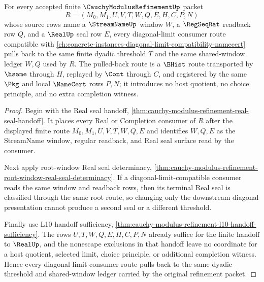 \begin{theorem}
\label{thm:cauchy-modulus-refinement-diagonal-route-pullback}
For every accepted finite $\CauchyModulusRefinementUp$ packet
$$
R=(M_0,M_1,U,V,T,W,Q,E,H,C,P,N)
$$
whose source rows name a $\StreamNameUp$ window $W$, a $\RegSeqRat$ readback row $Q$, and a $\RealUp$ seal row $E$, every diagonal-limit consumer route compatible with \autoref{ch:concrete-instances-diagonal-limit-compatibility-namecert} pulls back to the same finite dyadic threshold $T$ and the same shared-window ledger $W,Q$ used by $R$. The pulled-back route is a $\BHist$ route transported by $\hsame$ through $H$, replayed by $\Cont$ through $C$, and registered by the same $\Pkg$ and local $\NameCert$ rows $P,N$; it introduces no host quotient, no choice principle, and no extra completion witness.
\end{theorem}
\begin{proof}
Begin with the Real seal handoff, \autoref{thm:cauchy-modulus-refinement-real-seal-handoff}. It places every Real or Completion consumer of $R$ after the displayed finite route $M_0,M_1,U,V,T,W,Q,E$ and identifies $W,Q,E$ as the StreamName window, regular readback, and Real seal surface read by the consumer.

Next apply root-window Real seal determinacy, \autoref{thm:cauchy-modulus-refinement-root-window-real-seal-determinacy}. If a diagonal-limit-compatible consumer reads the same window and readback rows, then its terminal Real seal is classified through the same root route, so changing only the downstream diagonal presentation cannot produce a second seal or a different threshold.

Finally use L10 handoff sufficiency, \autoref{thm:cauchy-modulus-refinement-l10-handoff-sufficiency}. The rows $U,T,W,Q,E,H,C,P,N$ already suffice for the finite handoff to $\RealUp$, and the nonescape exclusions in that handoff leave no coordinate for a host quotient, selected limit, choice principle, or additional completion witness. Hence every diagonal-limit consumer route pulls back to the same dyadic threshold and shared-window ledger carried by the original refinement packet.
\end{proof}

